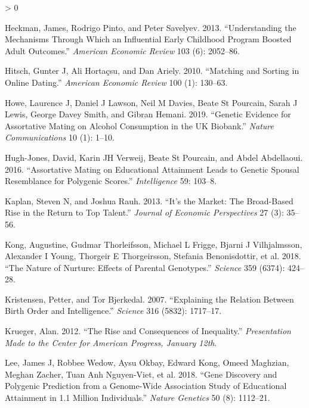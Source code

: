 \documentclass[
]{article}
\newlength{\cslhangindent}
\newenvironment{CSLReferences}[2] %
 {%
  \setlength{\parindent}{0pt}
  \ifodd #1 \everypar{\setlength{\hangindent}{\cslhangindent}}\ignorespaces\fi
  \ifnum #2 > 0
  \setlength{\parskip}{#2\baselineskip}
  \fi
 }%
 {}
\begin{document}
\begin{CSLReferences}{1}{0}
\leavevmode\hypertarget{ref-heckman2013understanding}{}%
Heckman, James, Rodrigo Pinto, and Peter Savelyev. 2013. {``Understanding the Mechanisms Through Which an Influential Early Childhood Program Boosted Adult Outcomes.''} \emph{American Economic Review} 103 (6): 2052--86.

\leavevmode\hypertarget{ref-hitsch2010matching}{}%
Hitsch, Gunter J, Ali Hortaçsu, and Dan Ariely. 2010. {``Matching and Sorting in Online Dating.''} \emph{American Economic Review} 100 (1): 130--63.

\leavevmode\hypertarget{ref-howe2019genetic}{}%
Howe, Laurence J, Daniel J Lawson, Neil M Davies, Beate St Pourcain, Sarah J Lewis, George Davey Smith, and Gibran Hemani. 2019. {``Genetic Evidence for Assortative Mating on Alcohol Consumption in the UK Biobank.''} \emph{Nature Communications} 10 (1): 1--10.

\leavevmode\hypertarget{ref-hugh2016assortative}{}%
Hugh-Jones, David, Karin JH Verweij, Beate St Pourcain, and Abdel Abdellaoui. 2016. {``Assortative Mating on Educational Attainment Leads to Genetic Spousal Resemblance for Polygenic Scores.''} \emph{Intelligence} 59: 103--8.

\leavevmode\hypertarget{ref-kaplan2013s}{}%
Kaplan, Steven N, and Joshua Rauh. 2013. {``It's the Market: The Broad-Based Rise in the Return to Top Talent.''} \emph{Journal of Economic Perspectives} 27 (3): 35--56.

\leavevmode\hypertarget{ref-kong2018nature}{}%
Kong, Augustine, Gudmar Thorleifsson, Michael L Frigge, Bjarni J Vilhjalmsson, Alexander I Young, Thorgeir E Thorgeirsson, Stefania Benonisdottir, et al. 2018. {``The Nature of Nurture: Effects of Parental Genotypes.''} \emph{Science} 359 (6374): 424--28.

\leavevmode\hypertarget{ref-kristensen2007explaining}{}%
Kristensen, Petter, and Tor Bjerkedal. 2007. {``Explaining the Relation Between Birth Order and Intelligence.''} \emph{Science} 316 (5832): 1717--17.

\leavevmode\hypertarget{ref-krueger2012rise}{}%
Krueger, Alan. 2012. {``The Rise and Consequences of Inequality.''} \emph{Presentation Made to the Center for American Progress, January 12th}.

\leavevmode\hypertarget{ref-lee2018gene}{}%
Lee, James J, Robbee Wedow, Aysu Okbay, Edward Kong, Omeed Maghzian, Meghan Zacher, Tuan Anh Nguyen-Viet, et al. 2018. {``Gene Discovery and Polygenic Prediction from a Genome-Wide Association Study of Educational Attainment in 1.1 Million Individuals.''} \emph{Nature Genetics} 50 (8): 1112--21.


\end{CSLReferences}
\end{document}
